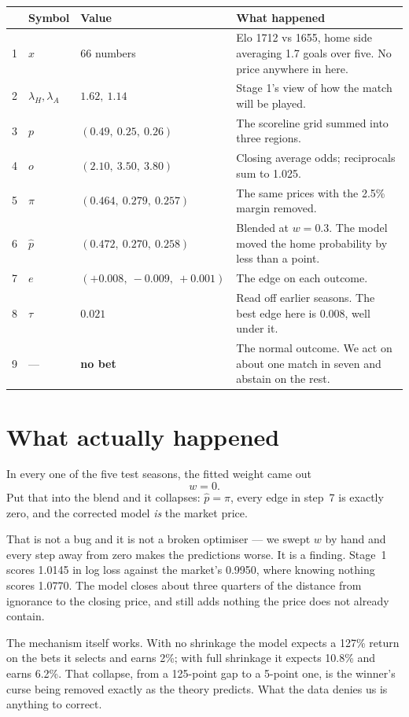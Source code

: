 \documentclass[11pt,a4paper]{article}
\begin{document}
\begin{center}
\begin{tabular}{@{}rllp{6.4cm}@{}}
\toprule
& \textbf{Symbol} & \textbf{Value} & \textbf{What happened}\\
\midrule
1 & $x$ & 66 numbers & Elo 1712 vs 1655, home side averaging 1.7 goals
                       over five. No price anywhere in here.\\[2pt]
2 & $\lambda_H,\lambda_A$ & $1.62,\ 1.14$ & Stage 1's view of how the match
                       will be played.\\[2pt]
3 & $p$ & $(0.49,\ 0.25,\ 0.26)$ & The scoreline grid summed into three
                       regions.\\[2pt]
4 & $o$ & $(2.10,\ 3.50,\ 3.80)$ & Closing average odds; reciprocals sum to
                       1.025.\\[2pt]
5 & $\pi$ & $(0.464,\ 0.279,\ 0.257)$ & The same prices with the 2.5\% margin
                       removed.\\[2pt]
6 & $\hat p$ & $(0.472,\ 0.270,\ 0.258)$ & Blended at $w=0.3$. The model moved
                       the home probability by less than a point.\\[2pt]
7 & $e$ & $(+0.008,\ -0.009,\ +0.001)$ & The edge on each outcome.\\[2pt]
8 & $\tau$ & $0.021$ & Read off earlier seasons. The best edge here is 0.008,
                       well under it.\\[2pt]
9 & --- & \textbf{no bet} & The normal outcome. We act on about one match in
                       seven and abstain on the rest.\\
\bottomrule
\end{tabular}
\end{center}

\section*{What actually happened}

In every one of the five test seasons, the fitted weight came out
\[
w = 0.
\]
Put that into the blend and it collapses: $\hat p = \pi$, every edge in step~7
is exactly zero, and the corrected model \emph{is} the market price.

That is not a bug and it is not a broken optimiser --- we swept $w$ by hand and
every step away from zero makes the predictions worse. It is a finding. Stage~1
scores 1.0145 in log loss against the market's 0.9950, where knowing nothing
scores 1.0770. The model closes about three quarters of the distance from
ignorance to the closing price, and still adds nothing the price does not
already contain.

The mechanism itself works. With no shrinkage the model expects a 127\% return
on the bets it selects and earns 2\%; with full shrinkage it expects 10.8\% and
earns 6.2\%. That collapse, from a 125-point gap to a 5-point one, is the
winner's curse being removed exactly as the theory predicts. What the data
denies us is anything to correct.
\end{document}
